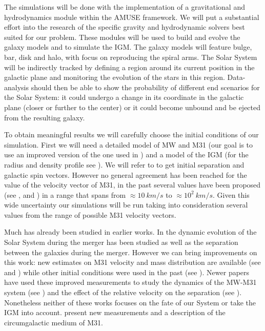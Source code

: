 \documentclass[10pt,english]{article}
\begin{document}
The simulations will be done with the implementation of a gravitational and hydrodynamics module within the AMUSE framework. We will put a substantial effort into the research of the specific gravity and hydrodynamic solvers best suited for our problem. These modules will be used to build and evolve the galaxy models and to simulate the IGM. The galaxy models will feature bulge, bar, disk and halo, with focus on reproducing the spiral arms. The Solar System will be indirectly tracked by defining a region around its current position in the galactic plane and monitoring the evolution of the stars in this region. Data-analysis should then be able to show the probability of different end scenarios for the Solar System: it could undergo a change in its coordinate in the galactic plane (closer or further to the center) or it could become unbound and be ejected from the resulting galaxy.\par
\smallskip
To obtain meaningful results we will carefully choose the initial conditions of our simulation. First we will need a detailed model of MW and M31 (our goal is to use an improved version of the one used in \textcite{Cox_2008}) and a model of the IGM (for the radius and density profile see \textcite{Lehner_2020}). We will refer to \textcite{Raychaudhury_1989} to get initial separation and galactic spin vectors. However no general agreement has been reached for the value of the velocity vector of M31, in the past several values have been proposed (see \textcite{van_der_Marel_2012b}, \textcite{Salomon_2016} and \textcite{van_der_Marel_2019}) in a range that spans from \(\approx 10\: km/s\) to \(\approx 10^2\: km/s\). Given this wide uncertainty our simulations will be run taking into consideration several values from the range of possible M31 velocity vectors.\par
\smallskip
Much has already been studied in earlier works. In \textcite{Cox_2008} the dynamic evolution of the Solar System during the merger has been studied as well as the separation between the galaxies during the merger. However we can bring improvements on this work: new estimates on M31 velocity and mass distribution are available (see \textcite{Sohn_2012} and \textcite{van_der_Marel_2012}) while other initial conditions were used in the past (see \textcite{Klypin_2002}). Newer papers have used these improved measurements to study the dynamics of the MW-M31 system (see \textcite{van_der_Marel_2012b}) and the effect of the relative velocity on the separation (see \textcite{Schiavi_2019}). Nonetheless neither of these works focuses on the fate of our System or take the IGM into account. \textcite{Lehner_2020} present new measurements and a description of the circumgalactic medium of M31.\par
\end{document}
